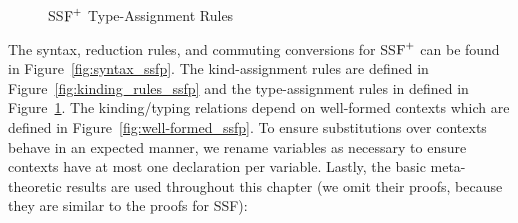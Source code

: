 \begin{figure}
  \setlength{\tabcolsep}{1pt}
    
    \caption{SS$\mbox{F}^{+}$ Type-Assignment Rules}
    \label{fig:typing_rules_ssfp}
  
\end{figure}
The syntax, reduction rules, and commuting conversions for SS$\mbox{F}^{+}$ can
be found in Figure~\ref{fig:syntax_ssfp}.  The kind-assignment rules are
defined in Figure~\ref{fig:kinding_rules_ssfp} and the type-assignment
rules in defined in Figure~\ref{fig:typing_rules_ssfp}. The
kinding/typing relations depend on well-formed contexts which are
defined in Figure~\ref{fig:well-formed_ssfp}.  To ensure substitutions
over contexts behave in an expected manner, we rename variables as
necessary to ensure contexts have at most one declaration per
variable.  Lastly, the basic meta-theoretic results are used
throughout this chapter (we omit their proofs, because they are
similar to the proofs for SSF):

